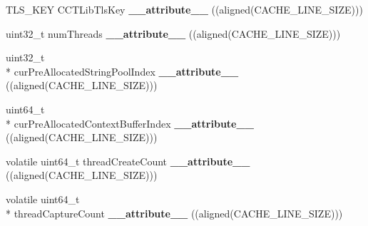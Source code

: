 \begin{DoxyCompactItemize}
\item 
\hypertarget{structPinCCTLib_1_1CCT__LIB__GLOBAL__STATE_aa3db9fa56c4347861a13e9f635533fe9}{T\-L\-S\-\_\-\-K\-E\-Y C\-C\-T\-Lib\-Tls\-Key {\bfseries \-\_\-\-\_\-attribute\-\_\-\-\_\-} ((aligned(C\-A\-C\-H\-E\-\_\-\-L\-I\-N\-E\-\_\-\-S\-I\-Z\-E)))}\label{structPinCCTLib_1_1CCT__LIB__GLOBAL__STATE_aa3db9fa56c4347861a13e9f635533fe9}

\item 
\hypertarget{structPinCCTLib_1_1CCT__LIB__GLOBAL__STATE_a4dbfd1f07fbe66037941bde8a5c2b8d5}{uint32\-\_\-t num\-Threads {\bfseries \-\_\-\-\_\-attribute\-\_\-\-\_\-} ((aligned(C\-A\-C\-H\-E\-\_\-\-L\-I\-N\-E\-\_\-\-S\-I\-Z\-E)))}\label{structPinCCTLib_1_1CCT__LIB__GLOBAL__STATE_a4dbfd1f07fbe66037941bde8a5c2b8d5}

\item 
\hypertarget{structPinCCTLib_1_1CCT__LIB__GLOBAL__STATE_a59c2d680b535543506c419e50b6f7914}{uint32\-\_\-t \\*
cur\-Pre\-Allocated\-String\-Pool\-Index {\bfseries \-\_\-\-\_\-attribute\-\_\-\-\_\-} ((aligned(C\-A\-C\-H\-E\-\_\-\-L\-I\-N\-E\-\_\-\-S\-I\-Z\-E)))}\label{structPinCCTLib_1_1CCT__LIB__GLOBAL__STATE_a59c2d680b535543506c419e50b6f7914}

\item 
\hypertarget{structPinCCTLib_1_1CCT__LIB__GLOBAL__STATE_ae57dbd59c4464bc429fed8db25fb1206}{uint64\-\_\-t \\*
cur\-Pre\-Allocated\-Context\-Buffer\-Index {\bfseries \-\_\-\-\_\-attribute\-\_\-\-\_\-} ((aligned(C\-A\-C\-H\-E\-\_\-\-L\-I\-N\-E\-\_\-\-S\-I\-Z\-E)))}\label{structPinCCTLib_1_1CCT__LIB__GLOBAL__STATE_ae57dbd59c4464bc429fed8db25fb1206}

\item 
\hypertarget{structPinCCTLib_1_1CCT__LIB__GLOBAL__STATE_a4371445089cf7f6daccb8e79f32b0780}{volatile uint64\-\_\-t thread\-Create\-Count {\bfseries \-\_\-\-\_\-attribute\-\_\-\-\_\-} ((aligned(C\-A\-C\-H\-E\-\_\-\-L\-I\-N\-E\-\_\-\-S\-I\-Z\-E)))}\label{structPinCCTLib_1_1CCT__LIB__GLOBAL__STATE_a4371445089cf7f6daccb8e79f32b0780}

\item 
\hypertarget{structPinCCTLib_1_1CCT__LIB__GLOBAL__STATE_a608d22bf62a2413d2c6f52803fbc7535}{volatile uint64\-\_\-t \\*
thread\-Capture\-Count {\bfseries \-\_\-\-\_\-attribute\-\_\-\-\_\-} ((aligned(C\-A\-C\-H\-E\-\_\-\-L\-I\-N\-E\-\_\-\-S\-I\-Z\-E)))}\label{structPinCCTLib_1_1CCT__LIB__GLOBAL__STATE_a608d22bf62a2413d2c6f52803fbc7535}


\end{DoxyCompactItemize}
